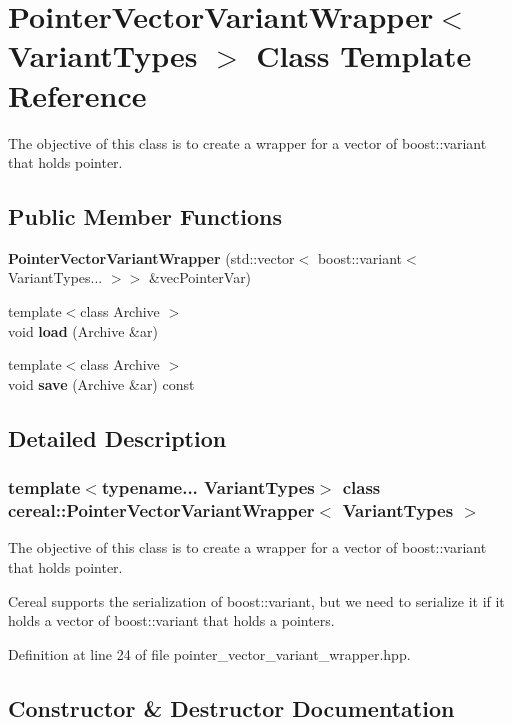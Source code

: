 \section{Pointer\+Vector\+Variant\+Wrapper$<$ Variant\+Types $>$ Class Template Reference}
\label{classcereal_1_1PointerVectorVariantWrapper}


The objective of this class is to create a wrapper for a vector of boost\+::variant that holds pointer.  


\subsection*{Public Member Functions}
\begin{DoxyCompactItemize}
\item 
\textbf{ Pointer\+Vector\+Variant\+Wrapper} (std\+::vector$<$ boost\+::variant$<$ Variant\+Types... $>$$>$ \&vec\+Pointer\+Var)
\item 
{\footnotesize template$<$class Archive $>$ }\\void \textbf{ load} (Archive \&ar)
\item 
{\footnotesize template$<$class Archive $>$ }\\void \textbf{ save} (Archive \&ar) const
\end{DoxyCompactItemize}


\subsection{Detailed Description}
\subsubsection*{template$<$typename... Variant\+Types$>$\newline
class cereal\+::\+Pointer\+Vector\+Variant\+Wrapper$<$ Variant\+Types $>$}

The objective of this class is to create a wrapper for a vector of boost\+::variant that holds pointer. 

Cereal supports the serialization of boost\+::variant, but we need to serialize it if it holds a vector of boost\+::variant that holds a pointers. 

Definition at line 24 of file pointer\+\_\+vector\+\_\+variant\+\_\+wrapper.\+hpp.



\subsection{Constructor \& Destructor Documentation}
\mbox{\label{classcereal_1_1PointerVectorVariantWrapper_a0aa4a1ce17aa0196d5a0218d59762324}} 
